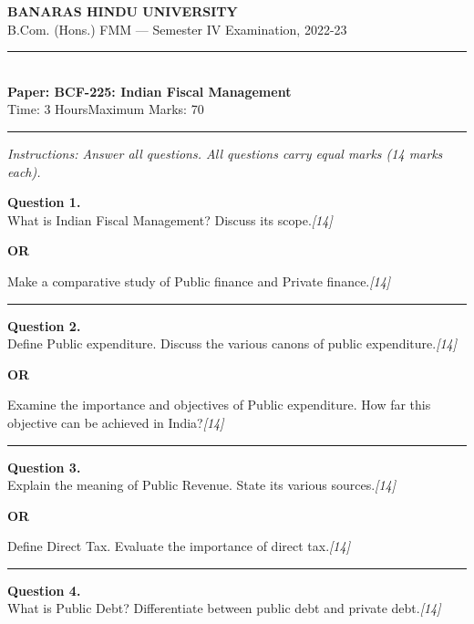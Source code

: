 \documentclass[11pt,a4paper]{article}
\newcommand{\pts}[1]{\hfill   \textit{[#1]}}
\begin{document}
\begin{center}
  {\large\bfseries BANARAS HINDU UNIVERSITY}\\[2pt]
  {\normalsize B.Com. (Hons.) FMM --- Semester IV Examination, 2022-23}\\[6pt]
  \rule{0.8\linewidth}{0.5pt}\\[6pt]
  {\large\bfseries Paper: BCF-225: Indian Fiscal Management}\\[4pt]
  {\normalsize Time: 3 Hours\hfill Maximum Marks: 70}
\end{center}

\rule{\linewidth}{0.4pt}

\smallskip



\noindent   \textit{Instructions: Answer all questions. All questions carry equal marks (14 marks each).}

\bigskip




\noindent   \textbf{Question 1.} \\
What is Indian Fiscal Management? Discuss its scope.\pts{14}

\centerline{   \textbf{OR}}

Make a comparative study of Public finance and Private finance.\pts{14}

\medskip\rule{\linewidth}{0.2pt}




\noindent   \textbf{Question 2.} \\
Define Public expenditure. Discuss the various canons of public expenditure.\pts{14}

\centerline{   \textbf{OR}}

Examine the importance and objectives of Public expenditure. How far this objective can be achieved in India?\pts{14}

\medskip\rule{\linewidth}{0.2pt}




\noindent   \textbf{Question 3.} \\
Explain the meaning of Public Revenue. State its various sources.\pts{14}

\centerline{   \textbf{OR}}

Define Direct Tax. Evaluate the importance of direct tax.\pts{14}

\medskip\rule{\linewidth}{0.2pt}




\noindent   \textbf{Question 4.} \\
What is Public Debt? Differentiate between public debt and private debt.\pts{14}
\end{document}
